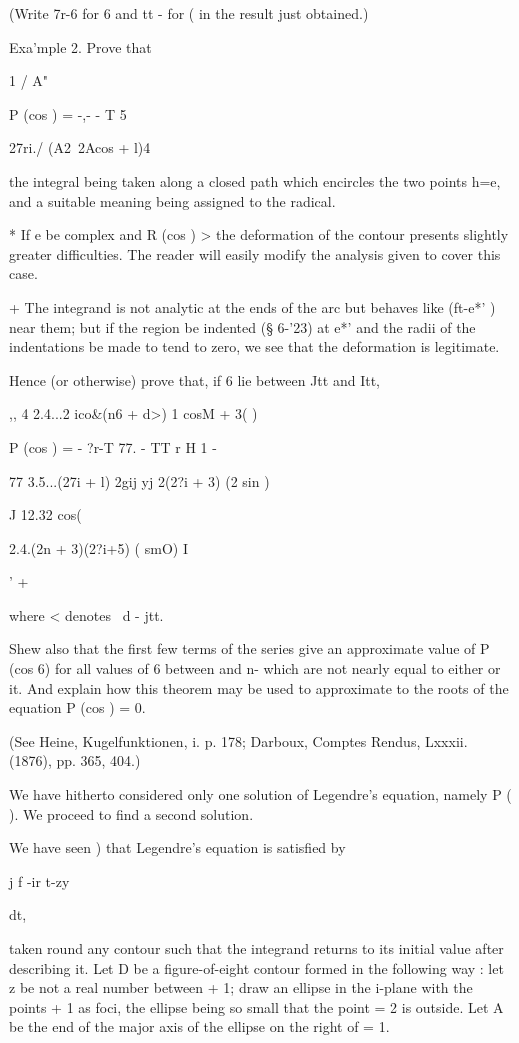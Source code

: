 {{(Write 7r-6 for 6 and tt - for ( in the result just obtained.)

Exa'mple 2. Prove that

1 / A"

P (cos ) = -,-  - T 5

27ri./ (A2\ 2Acos + l)4

the integral being taken along a closed path which encircles the two
points h=e, and a suitable meaning being assigned to the radical.

* If e be complex and R (cos ) > the deformation of the contour
presents slightly greater difficulties. The reader will easily modify
the analysis given to cover this case.

+ The integrand is not analytic at the ends of the arc but behaves
like (ft-e*' )~ near them; but if the region be indented (§ 6-'23) at
e*' and the radii of the indentations be made to tend to zero, we see
that the deformation is legitimate.

%
%

Hence (or otherwise) prove that, if 6 lie between Jtt and Itt,

,, 4 2.4...2 ico\&(n6 + d>) 1 cosM + 3( )\

P (cos ) = - ?r-T 77. - TT r H 1 -

77 3.5...(27i + l) 2gij yj 2(2?i + 3) (2 sin )

J 12.32 cos(%

2.4.(2n + 3)(2?i+5) ( smO) I

' +

where < denotes \ d - jtt.

Shew also that the first few terms of the series give an approximate
value of P (cos 6) for all values of 6 between and n- which are not
nearly equal to either or it. And explain how this theorem may be used
to approximate to the roots of the equation P (cos ) = 0.

(See Heine, Kugelfunktionen, i. p. 178; Darboux, Comptes Rendus,
Lxxxii. (1876), pp. 365, 404.)


We have hitherto considered only one solution of Legendre's equation,
namely P ( ). We proceed to find a second solution.

We have seen ) that Legendre's equation is satisfied by

j f -ir t-zy

dt,

taken round any contour such that the integrand returns to its initial
value after describing it. Let D be a figure-of-eight contour formed
in the following way : let z be not a real number between + 1; draw
an ellipse in the i-plane with the points + 1 as foci, the ellipse
being so small that the point = 2 is outside. Let A be the end of the
major axis of the ellipse on the right of = 1.

}}
